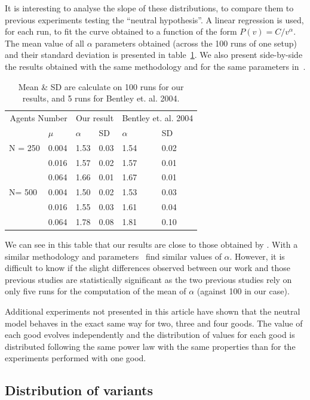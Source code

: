 \documentclass{wscpaperproc}
\begin{document}
It is interesting to analyse the slope of these distributions, to compare them to previous experiments testing the ``neutral hypothesis''. A linear regression is used, for each run, to fit the curve obtained to a function of the form $P(v)=C/v^\alpha $. The mean value of all $\alpha$ parameters obtained (across the 100 runs of one setup) and their standard deviation is presented in table~\ref{tab:mualpha}. We also present side-by-side the results obtained with the same methodology and for the same parameters in~\cite{bentley_random_2004}.

\begin{table}[h]
	\centering
	\begin{tabular}{ll|llll}
		\multicolumn{2}{r}{Agents Number}&\multicolumn{2}{c}{Our result}&\multicolumn{2}{c}{Bentley et. al. 2004}\\
			&$\mu$ & $\alpha$ & SD&$\alpha$&SD\\\hline
		N = 250	&0.004&1.53&0.03&1.54&0.02\\
			&0.016&1.57&0.02&1.57&0.01\\
			&0.064&1.66&0.01&1.67&0.01\\\hline
		N= 500	&0.004&1.50&0.02&1.53&0.03\\
			&0.016&1.55&0.03&1.61&0.04\\
			&0.064&1.78&0.08&1.81&0.10\\
	\end{tabular}
	\caption{Mean \& SD are calculate on 100 runs for our results, and 5 runs for Bentley et. al. 2004.}
	\label{tab:mualpha}
\end{table}

We can see in this table that our results are close to those obtained by \cite{bentley_random_2004}. With a similar methodology and parameters~\cite{mesoudi_random_2009} find similar values of $\alpha$. However, it is difficult to know if the slight differences observed between our work and those previous studies are statistically significant as the two previous studies rely on only five runs for the computation of the mean of $\alpha$ (against 100 in our case).

Additional experiments not presented in this article have shown that the neutral model behaves in the exact same way for two, three and four goods. The value of each good evolves independently and the distribution of values for each good is distributed following the same power law with the same properties than for the experiments performed with one good.

\subsection{Distribution of variants}
\end{document}
